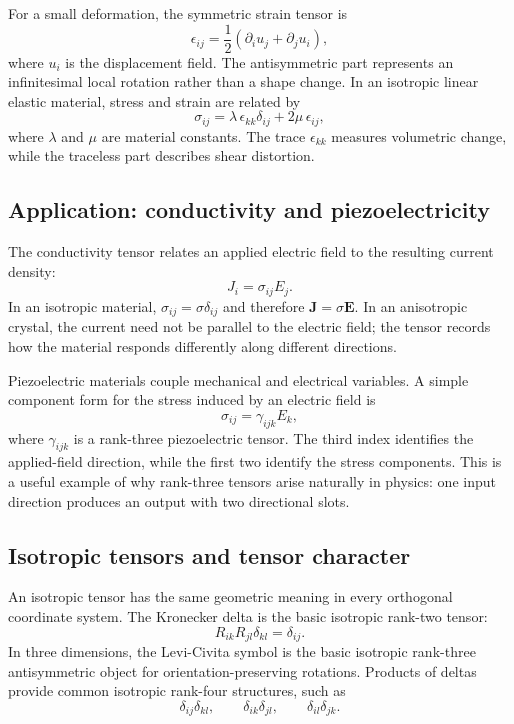 For a small deformation, the symmetric strain tensor is
\begin{equation}
\epsilon_{ij}=\frac12\left(\partial_i u_j+\partial_j u_i\right),
\end{equation}
where $u_i$ is the displacement field. The antisymmetric part represents an infinitesimal local rotation rather than a shape change. In an isotropic linear elastic material, stress and strain are related by
\begin{equation}
\sigma_{ij}=\lambda\,\epsilon_{kk}\delta_{ij}+2\mu\,\epsilon_{ij},
\end{equation}
where $\lambda$ and $\mu$ are material constants. The trace $\epsilon_{kk}$ measures volumetric change, while the traceless part describes shear distortion.

\subsection{Application: conductivity and piezoelectricity}
The conductivity tensor relates an applied electric field to the resulting current density:
\begin{equation}
J_i=\sigma_{ij}E_j.
\end{equation}
In an isotropic material, $\sigma_{ij}=\sigma\delta_{ij}$ and therefore $\mathbf{J}=\sigma\mathbf{E}$. In an anisotropic crystal, the current need not be parallel to the electric field; the tensor records how the material responds differently along different directions.

Piezoelectric materials couple mechanical and electrical variables. A simple component form for the stress induced by an electric field is
\begin{equation}
\sigma_{ij}=\gamma_{ijk}E_k,
\end{equation}
where $\gamma_{ijk}$ is a rank-three piezoelectric tensor. The third index identifies the applied-field direction, while the first two identify the stress components. This is a useful example of why rank-three tensors arise naturally in physics: one input direction produces an output with two directional slots.

\subsection{Isotropic tensors and tensor character}
An isotropic tensor has the same geometric meaning in every orthogonal coordinate system. The Kronecker delta is the basic isotropic rank-two tensor:
\begin{equation}
R_{ik}R_{jl}\delta_{kl}=\delta_{ij}.
\end{equation}
In three dimensions, the Levi-Civita symbol is the basic isotropic rank-three antisymmetric object for orientation-preserving rotations. Products of deltas provide common isotropic rank-four structures, such as
\begin{equation}
\delta_{ij}\delta_{kl},
\qquad
\delta_{ik}\delta_{jl},
\qquad
\delta_{il}\delta_{jk}.
\end{equation}


